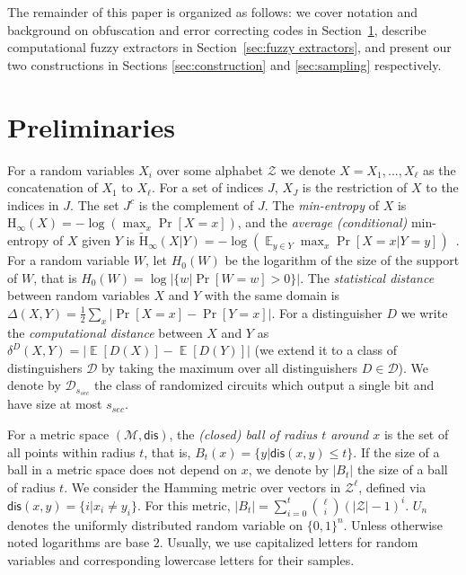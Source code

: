 \documentclass[11pt]{article}
\newcommand{\secref}[1]{\mbox{Section~\ref{#1}}}
\DeclareMathOperator*{\expe}{\mathbb{E}}
\newcommand{\dis}{\ensuremath{\mathsf{dis}}}
\newcommand{\Hoo}{\mathrm{H}_\infty}
\newcommand{\Hav}{\tilde{\mathrm{H}}_\infty}
\begin{document}
\medskip
The remainder of this paper is organized as follows: we cover notation and background on obfuscation and error correcting codes in \secref{sec:preliminaries}, describe computational fuzzy extractors in \secref{sec:fuzzy extractors}, and present our two constructions in Sections \ref{sec:construction} and \ref{sec:sampling} respectively.

\section{Preliminaries}
\label{sec:preliminaries}
For a random variables $X_i$ over some alphabet $\mathcal{Z}$ we denote $X = X_1,..., X_\ell$ as the concatenation of $X_1$ to $X_\ell$.  For a set of indices $J$, $X_{J}$ is the restriction of $X$ to the indices in $J$.  The set $J^c$ is the complement of $J$.  The {\em min-entropy} of $X$ is $\Hoo(X) = -\log(\max_x \Pr[X=x])$,
and the {\em average (conditional)} min-entropy of $X$ given $Y$ is  $\Hav(X|Y) = -\log(\expe_{y\in Y} \max_{x} \Pr[X=x|Y=y])$~\cite[Section 2.4]{DBLP:journals/siamcomp/DodisORS08}.   For a random variable $W$, let $H_0(W)$ be the logarithm of the size of the support of $W$,  that is $H_0(W) = \log |\{w | \Pr[W=w]>0\}|$.
The {\em statistical distance} between random variables $X$ and $Y$ with the same domain is $\Delta(X,Y) = \frac12 \sum_x |\Pr[X=x] - \Pr[Y=x]|$.
For a distinguisher $D$ we write the \emph{computational distance} between $X$ and $Y$ as $\delta^D(X,Y) = \left| \expe[D(X)]-\expe[D(Y)]\right |$ (we extend it to a class of distinguishers $\mathcal{D}$ by taking the maximum over all distinguishers $D\in\mathcal{D}$).  We denote by $\mathcal{D}_{s_{sec}}$ the class of randomized circuits which output a single bit and have size at most $s_{sec}$.

For a metric space $(\mathcal{M}, \dis)$, the \emph{(closed) ball of radius $t$ around $x$} is the set of all points within radius $t$, that is, $B_t(x) = \{y| \dis(x, y)\leq t\}$.  If the size of a ball in a metric space does not depend on $x$, we denote by $|B_t|$ the size of a ball of radius $t$.  We consider the Hamming metric over vectors in $\mathcal{Z}^\ell$, defined via $\dis(x,y) = \{i | x_i \neq y_i\}$.  For this metric, $|B_t| = \sum_{i=0}^t {\ell \choose i} (|\mathcal{Z}|-1)^i $.  $U_n$ denotes the uniformly  distributed random variable on $\{0,1\}^n$.  Unless otherwise noted logarithms are base $2$.
Usually, we use capitalized letters for random variables and corresponding lowercase letters for their samples.
\end{document}
